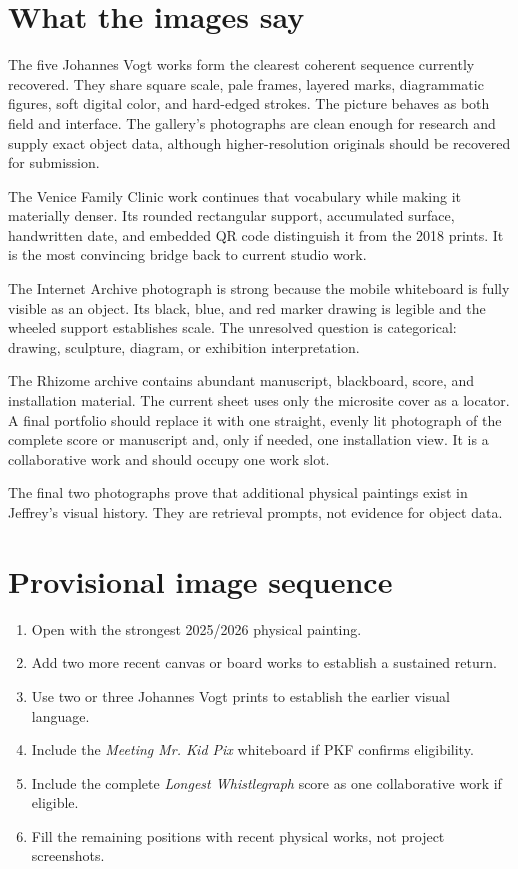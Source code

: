 \documentclass[11pt,letterpaper]{article}
\begin{document}
\section{What the images say}

The five Johannes Vogt works form the clearest coherent sequence currently recovered. They share square scale, pale frames, layered marks, diagrammatic figures, soft digital color, and hard-edged strokes. The picture behaves as both field and interface. The gallery's photographs are clean enough for research and supply exact object data, although higher-resolution originals should be recovered for submission.

The Venice Family Clinic work continues that vocabulary while making it materially denser. Its rounded rectangular support, accumulated surface, handwritten date, and embedded QR code distinguish it from the 2018 prints. It is the most convincing bridge back to current studio work.

The Internet Archive photograph is strong because the mobile whiteboard is fully visible as an object. Its black, blue, and red marker drawing is legible and the wheeled support establishes scale. The unresolved question is categorical: drawing, sculpture, diagram, or exhibition interpretation.

The Rhizome archive contains abundant manuscript, blackboard, score, and installation material. The current sheet uses only the microsite cover as a locator. A final portfolio should replace it with one straight, evenly lit photograph of the complete score or manuscript and, only if needed, one installation view. It is a collaborative work and should occupy one work slot.

The final two photographs prove that additional physical paintings exist in Jeffrey's visual history. They are retrieval prompts, not evidence for object data.

\section{Provisional image sequence}

\begin{enumerate}
\item Open with the strongest 2025/2026 physical painting.
\item Add two more recent canvas or board works to establish a sustained return.
\item Use two or three Johannes Vogt prints to establish the earlier visual language.
\item Include the \textit{Meeting Mr. Kid Pix} whiteboard if PKF confirms eligibility.
\item Include the complete \textit{Longest Whistlegraph} score as one collaborative work if eligible.
\item Fill the remaining positions with recent physical works, not project screenshots.
\end{enumerate}
\end{document}
